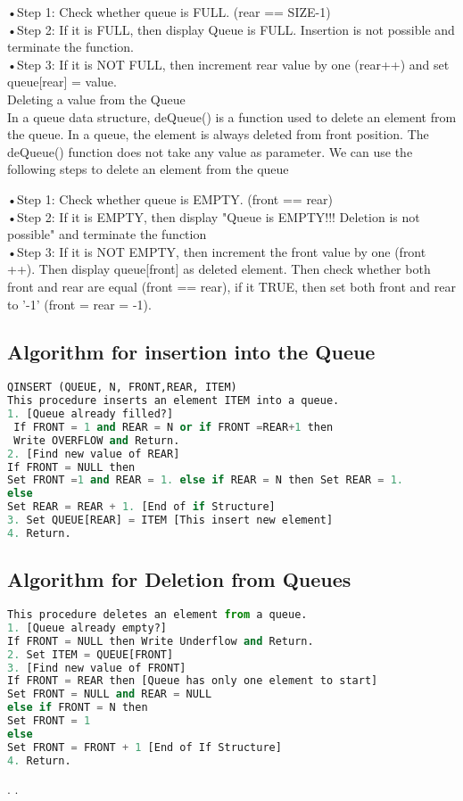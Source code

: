 \documentclass[11pt]{article}            %
\begin{document}
•Step 1: Check whether queue is FULL. (rear == SIZE-1)\\
•Step 2: If it is FULL, then display Queue is FULL. Insertion is not possible and terminate the function.\\
•Step 3: If it is NOT FULL, then increment rear value by one (rear++) and set queue[rear] = value.\\

 Deleting a value from the Queue\\

In a queue data structure, deQueue() is a function used to delete an element from the queue. In a queue, the element is always deleted from front position. The deQueue() function does not take any value as parameter. We can use the following steps to delete an element from the queue

•Step 1: Check whether queue is EMPTY. (front == rear)\\
•Step 2: If it is EMPTY, then display "Queue is EMPTY!!! Deletion is not possible" and terminate the function\\
•Step 3: If it is NOT EMPTY, then increment the front value by one (front ++). Then display queue[front] as deleted element. Then check whether both front and rear are equal (front == rear), if it TRUE, then set both front and rear to '-1' (front = rear = -1).\\

 \subsection{ Algorithm for insertion into the Queue}
\begin{lstlisting}[language=Python]
 QINSERT (QUEUE, N, FRONT,REAR, ITEM) 
This procedure inserts an element ITEM into a queue. 
1. [Queue already filled?]
 If FRONT = 1 and REAR = N or if FRONT =REAR+1 then
 Write OVERFLOW and Return.
2. [Find new value of REAR] 
If FRONT = NULL then
Set FRONT =1 and REAR = 1. else if REAR = N then Set REAR = 1.  
else 
Set REAR = REAR + 1. [End of if Structure] 
3. Set QUEUE[REAR] = ITEM [This insert new element]
4. Return.  
\end{lstlisting}
 \subsection{ Algorithm for Deletion from Queues}
\begin{lstlisting}[language=python]
This procedure deletes an element from a queue.
1. [Queue already empty?]
If FRONT = NULL then Write Underflow and Return. 
2. Set ITEM = QUEUE[FRONT] 
3. [Find new value of FRONT] 
If FRONT = REAR then [Queue has only one element to start] 
Set FRONT = NULL and REAR = NULL 
else if FRONT = N then 
Set FRONT = 1 
else 
Set FRONT = FRONT + 1 [End of If Structure] 
4. Return.   
\end{lstlisting}
.
.
\end{document}
